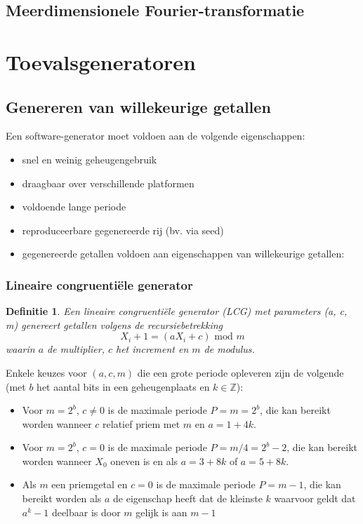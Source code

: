 \documentclass{article}
\newtheorem{mydef}{Definitie}
\begin{document}
	\subsection{Meerdimensionele Fourier-transformatie}
	
	\section{Toevalsgeneratoren}
	
	\subsection{Genereren van willekeurige getallen}
	
	Een software-generator moet voldoen aan de volgende eigenschappen:
	
	\begin{itemize}
		\item snel en weinig geheugengebruik
		\item draagbaar over verschillende platformen
		\item voldoende lange periode
		\item reproduceerbare gegenereerde rij (bv. via seed)
		\item gegenereerde getallen voldoen aan eigenschappen van willekeurige getallen:
	\end{itemize}

	\subsubsection{Lineaire congruentiële generator}

	\begin{mydef}
		Een lineaire congruentiële generator (LCG) met parameters (a, c, m) genereert getallen volgens de recursiebetrekking
		$$
			X_i+1 = (aX_i + c)\text{ mod }m
		$$
		waarin $a$ de \textit{multiplier}, $c$ het \textit{increment} en $m$ de \textit{modulus}.
	\end{mydef}

	Enkele keuzes voor $(a,c,m)$ die een grote periode opleveren zijn de volgende (met $b$ het aantal bits in een geheugenplaats en $k \in \mathbb{Z}$):
	\begin{itemize}
		\item Voor $m=2^b$, $c \neq 0$ is de maximale periode $P=m=2^b$, die kan bereikt worden wanneer $c$ relatief priem met $m$ en $a=1+4k$.
		\item Voor $m=2^b$, $c=0$ is de maximale periode $P=m/4=2^b-2$, die kan bereikt worden wanneer $X_0$ oneven is en als $a=3+8k$ of $a=5+8k$.
		\item Als $m$ een priemgetal en $c=0$ is de maximale periode $P=m-1$, die kan bereikt worden als $a$ de eigenschap heeft dat de kleinste $k$ waarvoor geldt dat $a^k-1$ deelbaar is door $m$ gelijk is aan $m-1$
	\end{itemize}
	
\end{document}
